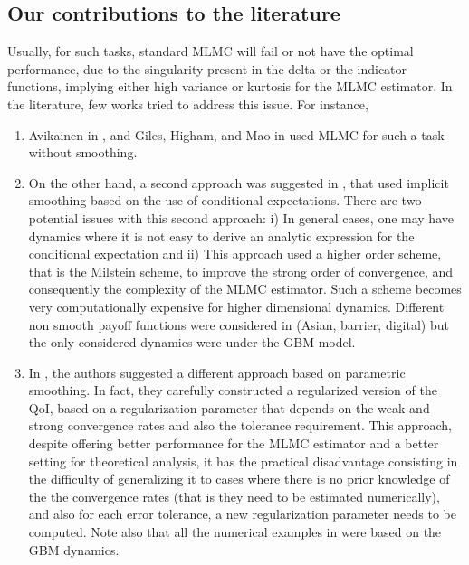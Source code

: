 \subsection{Our contributions to the literature}
Usually, for such  tasks, standard MLMC will fail or not have the optimal performance, due to the singularity present in the delta or the indicator functions, implying either high variance or kurtosis for the MLMC estimator. In the literature, few works tried to address this issue. For instance,
\begin{enumerate}
\item Avikainen in \cite{avikainen2009irregular}, and Giles, Higham, and Mao in \cite{giles2009analysing} used MLMC for such a task without smoothing.
\item On the other hand, a second approach  was suggested in  \cite{giles2008improved,giles2013numerical}, that used implicit smoothing based on the use of conditional expectations. There are two potential issues  with this second approach: i) In general cases, one may have dynamics where it is not easy to derive an  analytic expression for the conditional expectation and ii) This approach used a higher order scheme, that is the Milstein scheme, to improve the strong order of convergence, and consequently the complexity of the MLMC estimator. Such a scheme becomes very computationally expensive for higher dimensional dynamics. Different non smooth payoff functions were considered in \cite{giles2008improved,giles2013numerical} (Asian, barrier, digital)  but the only considered dynamics were under the GBM model.
\item In \cite{giles2015multilevel}, the authors suggested a different approach based on parametric smoothing.  In fact, they carefully constructed a regularized version of the QoI, based on a 
regularization parameter that depends on the weak and strong convergence rates and also  the tolerance requirement.  This approach, despite offering better performance for the MLMC estimator and a better setting for theoretical analysis, it has the practical disadvantage consisting in the difficulty of generalizing it to cases where there is no prior knowledge of the the convergence rates (that is they need to be estimated numerically), and also for each error tolerance, a new  regularization parameter needs to be computed. Note also that all the numerical examples in \cite{giles2015multilevel} were based on the GBM dynamics.
\end{enumerate}    

